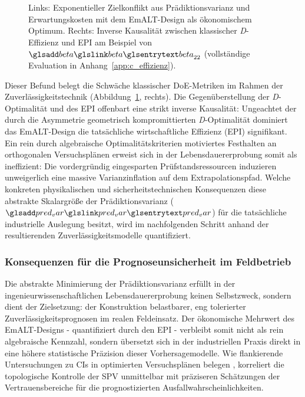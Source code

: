 \begin{figure}[htbp]
    \centering
    \setlength{}
    \setlength\figureheight{5cm}
    
    \caption{Links: Exponentieller Zielkonflikt aus Prädiktionsvarianz und Erwartungskosten mit dem \ac{EmALT}-Design als ökonomischem Optimum. Rechts: Inverse Kausalität zwischen klassischer \textit{D}-Effizienz und \ac{EPI} am Beispiel von $\sym{beta}_{22}$ (vollständige Evaluation in Anhang~\ref{app:c_effizienz}).}
    \label{fig:ma_abb5.4.3_tradeoff_eco}
\end{figure}
Dieser Befund belegt die Schwäche klassischer \ac{DoE}-Metriken im Rahmen der Zuverlässigkeitstechnik (Abbildung~\ref{fig:ma_abb5.4.3_tradeoff_eco}, rechts).
Die Gegenüberstellung der \textit{D}-Optimalität und des \ac{EPI} offenbart eine strikt inverse Kausalität:
Ungeachtet der durch die Asymmetrie geometrisch kompromittierten \textit{D}-Optimalität dominiert das \ac{EmALT}-Design die tatsächliche wirtschaftliche Effizienz (\ac{EPI}) signifikant.
Ein rein durch algebraische Optimalitätskriterien motiviertes Festhalten an orthogonalen Versuchsplänen erweist sich in der Lebensdauererprobung somit als ineffizient: Die vordergründig eingesparten Prüfstandsressourcen induzieren unweigerlich eine massive Varianzinflation auf dem Extrapolationspfad.
Welche konkreten physikalischen und sicherheitstechnischen Konsequenzen diese abstrakte Skalargröße der Prädiktionsvarianz ($\sym{pred_var}$) für die tatsächliche industrielle Auslegung besitzt, wird im nachfolgenden Schritt anhand der resultierenden Zuverlässigkeitsmodelle quantifiziert.



\subsubsection{Konsequenzen für die Prognoseunsicherheit im Feldbetrieb} \label{subsubsec:ci_reliability}

Die abstrakte Minimierung der Prädiktionsvarianz erfüllt in der ingenieurwissenschaftlichen Lebensdauererprobung keinen Selbstzweck, sondern dient der Zielsetzung: der Konstruktion belastbarer, eng tolerierter Zuverlässigkeitsprognosen im realen Feldeinsatz.
Der ökonomische Mehrwert des \ac{EmALT}-Designs - quantifiziert durch den \ac{EPI} - verbleibt somit nicht als rein algebraische Kennzahl, sondern übersetzt sich in der industriellen Praxis direkt in eine höhere statistische Präzision dieser Vorhersagemodelle.
Wie flankierende Untersuchungen zu \acp{CI} in optimierten Versuchsplänen belegen \cite{Arndt.2025}, korreliert die topologische Kontrolle der \ac{SPV} unmittelbar mit präziseren Schätzungen der Vertrauensbereiche für die prognostizierten Ausfallwahrscheinlichkeiten.

